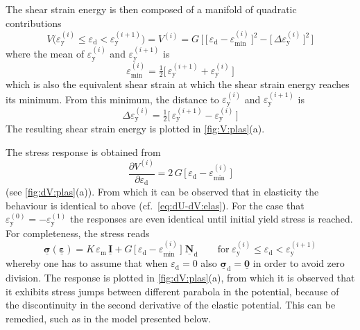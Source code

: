 \documentclass[fleqn, colorlinks]{goose-article}
\newcommand\T[1]{\underline{\bm{{#1}}}}
\begin{document}
The shear strain energy is then composed of a manifold of quadratic contributions
\begin{equation}
    \label{eq:V-plas}
    V \big(
        \varepsilon_\mathrm{y}^{(i)} \leq \varepsilon_\mathrm{d} < \varepsilon_\mathrm{y}^{(i+1)}
    \big)
    =
    V^{(i)}
    =
    G \, \bigg[\,
        \Big[\, \varepsilon_\mathrm{d} - \varepsilon_\mathrm{min}^{(i)} \,\Big]^2
        -
        \Big[\, \Delta \varepsilon_\mathrm{y}^{(i)} \,\Big]^2
    \,\bigg]
\end{equation}
where the mean of $\varepsilon_\mathrm{y}^{(i)}$ and $\varepsilon_\mathrm{y}^{(i+1)}$ is
\begin{equation}
    \varepsilon_\mathrm{min}^{(i)}
    =
    \tfrac{1}{2} \Big[\, \varepsilon_\mathrm{y}^{(i+1)} + \varepsilon_\mathrm{y}^{(i)} \,\Big]
\end{equation}
which is also the equivalent shear strain at which the shear strain energy reaches its minimum.
From this minimum, the distance to $\varepsilon_\mathrm{y}^{(i)}$ and
$\varepsilon_\mathrm{y}^{(i+1)}$ is
\begin{equation}
    \Delta \varepsilon_\mathrm{y}^{(i)}
    =
    \tfrac{1}{2} \Big[\, \varepsilon_\mathrm{y}^{(i+1)} - \varepsilon_\mathrm{y}^{(i)} \,\Big]
\end{equation}
The resulting shear strain energy is plotted in \cref{fig:V:plas}(a).

The stress response is obtained from
\begin{equation}
    \label{eq:dV-plas}
    \frac{\partial V^{(i)}}{\partial \varepsilon_\mathrm{d}}
    =
    2 \, G \, \Big[\, \varepsilon_\mathrm{d} - \varepsilon_\mathrm{min}^{(i)} \,\Big]
\end{equation}
(see \cref{fig:dV:plas}(a)).
From which it can be observed that in elasticity the behaviour is identical to above
(cf.~\cref{eq:dU-dV:elas}).
For the case that $\varepsilon_\mathrm{y}^{(0)} = - \varepsilon_\mathrm{y}^{(1)}$ the
responses are even identical until initial yield stress is reached.
For completeness, the stress reads
\begin{equation}
    \T{\sigma} ( \T{\varepsilon} )
    =
    K \, \varepsilon_\mathrm{m} \, \T{I}
    +
    G \, \Big[\, \varepsilon_\mathrm{d} - \varepsilon_\mathrm{min}^{(i)} \,\Big] \;
    \T{N}_\mathrm{d}
    \qquad
    \mathrm{for}
    \;
    \varepsilon_\mathrm{y}^{(i)} \leq \varepsilon_\mathrm{d} < \varepsilon_\mathrm{y}^{(i+1)}
\end{equation}
whereby one has to assume that when $\varepsilon_\mathrm{d} = 0$ also
$\T{\sigma}_\mathrm{d} = \T{0}$ in order to avoid zero division.
The response is plotted in \cref{fig:dV:plas}(a),
from which it is observed that it exhibits stress jumps between different parabola in the potential,
because of the discontinuity in the second derivative of the elastic potential.
This can be remedied, such as in the model presented below.
\end{document}
